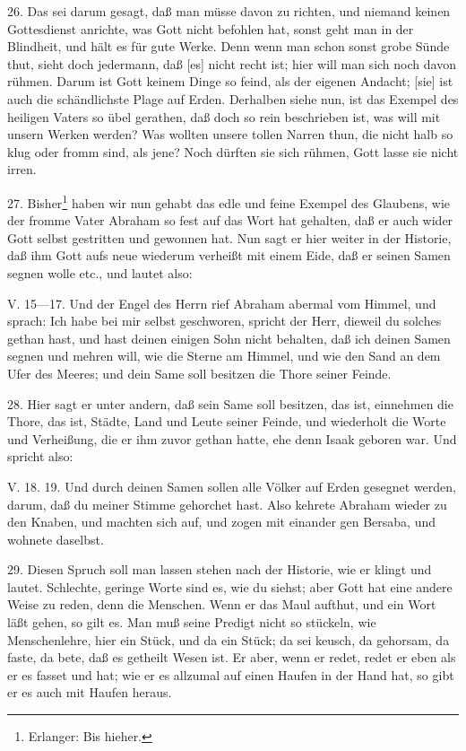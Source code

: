 26. Das sei darum gesagt, daß man müsse davon zu richten, und niemand keinen Gottesdienst anrichte, was Gott nicht befohlen hat, sonst geht man in der Blindheit, und hält es für gute Werke. Denn wenn man schon sonst grobe Sünde thut, sieht doch jedermann, daß [es] nicht recht ist; hier will man sich noch davon rühmen. Darum ist Gott keinem Dinge so feind, als der eigenen Andacht; [sie] ist auch die schändlichste Plage auf Erden. Derhalben siehe nun, ist das Exempel des heiligen Vaters so übel gerathen, daß doch so rein beschrieben ist, was will mit unsern Werken werden? Was wollten unsere tollen Narren thun, die nicht halb so klug oder fromm sind, als jene? Noch dürften sie sich rühmen, Gott lasse sie nicht irren.

27. Bisher\footnote{Erlanger: Bis hieher.} haben wir nun gehabt das edle und feine Exempel des Glaubens, wie der fromme Vater Abraham so fest auf das Wort hat gehalten, daß er auch wider Gott selbst gestritten und gewonnen hat. Nun sagt er hier weiter in der Historie, daß ihm Gott aufs neue wiederum verheißt mit einem Eide, daß er seinen Samen segnen wolle etc., und lautet also:

V. 15—17. Und der Engel des Herrn rief Abraham abermal vom Himmel, und sprach: Ich habe bei mir selbst geschworen, spricht der Herr, dieweil du solches gethan hast, und hast deinen einigen Sohn nicht behalten, daß ich deinen Samen segnen und mehren will, wie die Sterne am Himmel, und wie den Sand an dem Ufer des Meeres; und dein Same soll besitzen die Thore seiner Feinde.

28. Hier sagt er unter andern, daß sein Same soll besitzen, das ist, einnehmen die Thore, das ist, Städte, Land und Leute seiner Feinde, und wiederholt die Worte und Verheißung, die er ihm zuvor gethan hatte, ehe denn Isaak geboren war. Und spricht also:

V. 18. 19. Und durch deinen Samen sollen alle Völker auf Erden gesegnet werden, darum, daß du meiner Stimme gehorchet hast. Also kehrete Abraham wieder zu den Knaben, und machten sich auf, und zogen mit einander gen Bersaba, und wohnete daselbst.

29. Diesen Spruch soll man lassen stehen nach der Historie, wie er klingt und lautet. Schlechte, geringe Worte sind es, wie du siehst; aber Gott hat eine andere Weise zu reden, denn die Menschen. Wenn er das Maul aufthut, und ein Wort läßt gehen, so gilt es. Man muß seine Predigt nicht so stückeln, wie Menschenlehre, hier ein Stück, und da ein Stück; da sei keusch, da gehorsam, da faste, da bete, daß es getheilt Wesen ist. Er aber, wenn er redet, redet er eben als er es fasset und hat; wie er es allzumal auf einen Haufen in der Hand hat, so gibt er es auch mit Haufen heraus.

